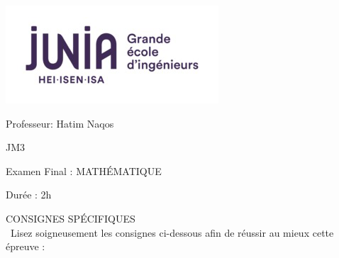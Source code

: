 \documentclass{book}%
\begin{document}
%
\normalsize%
\newpage%
\thispagestyle{empty}%
\vskip-40mm	\includegraphics[scale=0.5]{logo.png} \\%
 \begin{flushright}  \vskip-20mm   Professeur: Hatim Naqos\vskip15mm  \end{flushright}%
JM3%
\begin{center}   \begin{Large}Examen Final : MATHÉMATIQUE\end{Large} \end{center}%
Durée : 2h%
 \begin{center} { \large CONSIGNES SPÉCIFIQUES } \\\ Lisez soigneusement les consignes ci-dessous afin de réussir au mieux cette épreuve : \end{center} %
\end{document}
